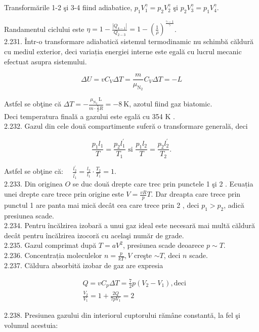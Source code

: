 \documentclass[10pt]{article}
\begin{document}
Transformările 1-2 şi 3-4 fiind adiabatice, $p_{1} V_{1}^{\gamma}=p_{2} V_{2}^{\gamma}$ şi $p_{2} V_{3}^{\gamma}=p_{1} V_{4}^{\gamma}$.

Randamentul ciclului este $\eta=1-\frac{\left|Q_{4-1}\right|}{Q_{2-3}}=1-\left(\frac{1}{\rho}\right)^{\frac{\gamma-1}{\gamma}}$.\\
2.231. Într-o transformare adiabatică sistemul termodinamic nu schimbă căldură cu mediul exterior, deci variația energiei interne este egală cu lucrul mecanic efectuat asupra sistemului.

$$
\Delta U=v C_{V} \Delta T=\frac{m}{\mu_{\mathrm{N}_{2}}} C_{V} \Delta T=-L
$$

Astfel se obţine că $\Delta T=-\frac{\mu_{\mathrm{N}_{2}} \mathrm{~L}}{m \cdot \frac{5}{2} R}=-8 \mathrm{~K}$, azotul fiind gaz biatomic.\\
Deci temperatura finală a gazului este egală cu 354 K .\\
2.232. Gazul din cele două compartimente suferă o transformare generală, deci

$$
\frac{p_{1} l_{1}}{T}=\frac{p_{2} l_{1}^{\prime}}{T_{1}} \text { si } \frac{p_{1} l_{2}}{T}=\frac{p_{2} l_{2}^{\prime}}{T_{2}} .
$$

Astfel se obţine că: $\quad \frac{l_{2}^{\prime}}{l_{1}^{\prime}}=\frac{l_{2}}{l_{1}} \cdot \frac{T_{2}}{T_{1}}=1$.\\
2.233. Din originea $O$ se duc două drepte care trec prin punctele 1 şi 2 . Ecuația unei drepte care trece prin origine este $V=\frac{v R}{p} T$. Dar dreapta care trece prin punctul 1 are panta mai mică decât cea care trece prin 2 , deci $p_{1}>p_{2}$, adică presiunea scade.\\
2.234. Pentru încălzirea izobară a unui gaz ideal este necesară mai multă căldură decât pentru încălzirea izocoră cu acelaşi număr de grade.\\
2.235. Gazul comprimat după $T=a V^{2}$, presiunea scade deoarece $p \sim T$.\\
2.236. Concentrația moleculelor $n=\frac{p}{k T}, V$ creşte $\sim T$, deci $n$ scade.\\
2.237. Căldura absorbită izobar de gaz are expresia

$$
\begin{aligned}
& Q=v C_{p} \Delta T=\frac{7}{2} p\left(V_{2}-V_{1}\right), \mathrm{deci} \\
& \frac{V_{2}}{V_{1}}=1+\frac{2 Q}{7 p V_{1}}=2
\end{aligned}
$$

2.238. Presiunea gazului din interiorul cuptorului rămâne constantă, la fel şi volumul acestuia:
\end{document}
